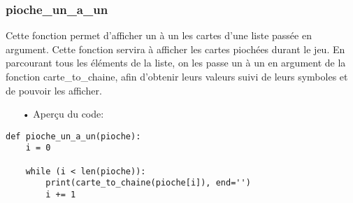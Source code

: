 	\subsubsection{pioche\_un\_a\_un}
	Cette fonction permet d'afficher un à un les cartes d'une liste passée en argument. Cette fonction servira à afficher les cartes piochées durant le jeu. En parcourant tous les éléments de la liste, on les passe un à un en argument de la fonction carte\_to\_chaine, afin d'obtenir leurs valeurs suivi de leurs symboles et de pouvoir les afficher.
		\\
	\begin{itemize}
	\color{blue}\item[•]Aperçu du code:
	\end{itemize}
 	
 	\lstset{language=Python}
	\lstset{frame=lines}
	\lstset{basicstyle=\footnotesize}
	\begin{lstlisting}
def pioche_un_a_un(pioche):
    i = 0

    while (i < len(pioche)):
        print(carte_to_chaine(pioche[i]), end='')
        i += 1
	
	\end{lstlisting}